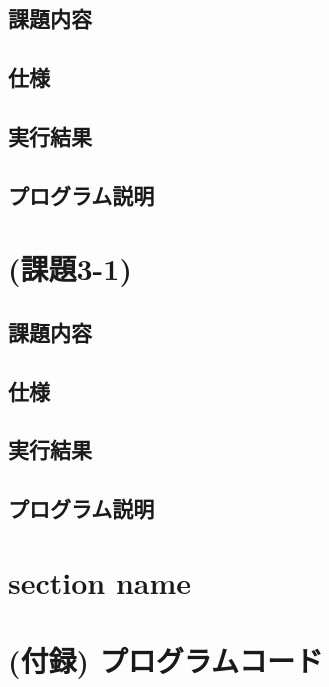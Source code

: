 \documentclass[a4j]{jarticle}
\begin{document}
\subsection{課題内容}

\subsection{仕様}

\subsection{実行結果}

\subsection{プログラム説明}


\section{(課題3-1) }

\subsection{課題内容}

\subsection{仕様}

\subsection{実行結果}

\subsection{プログラム説明}






\appendix %
\section{section name}

\section{(付録) プログラムコード}
\end{document}
